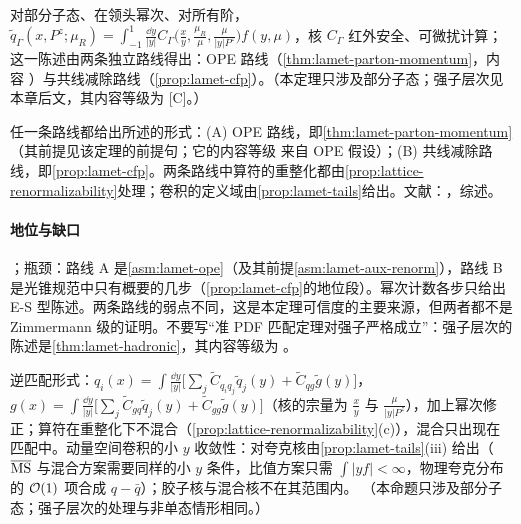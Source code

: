 \begin{theorem}\label{thm:lattice-lamet}
对部分子态、在领头幂次、对所有阶，$\tilde q_\Gamma(x,P^z;\mu_R)=\int_{-1}^1\frac{\dd y}{|y|}C_\Gamma\big(\frac xy,\frac{\mu_R}\mu,\frac\mu{|y|P^z}\big)f(y,\mu)$，核 $C_\Gamma$ 红外安全、可微扰计算；这一陈述由两条独立路线得出：OPE 路线（\cref{thm:lamet-parton-momentum}，内容 \tagA）与共线减除路线（\cref{prop:lamet-cfp}）。（本定理只涉及部分子态；强子层次见本章后文，其内容等级为 [C]。）
\end{theorem}

\begin{proofsketch}
任一条路线都给出所述的形式：(A) OPE 路线，即\cref{thm:lamet-parton-momentum}（其前提见该定理的前提句；它的内容等级 \tagA 来自 OPE 假设）；(B) 共线减除路线，即\cref{prop:lamet-cfp}。两条路线中算符的重整化都由\cref{prop:lattice-renormalizability}处理；卷积的定义域由\cref{prop:lamet-tails}给出。文献：\cite{IzubuchiEtAl2018,Ma:2014jla,MaQiu2018,JiEtAl2021}，综述\cite{Constantinou:2020hdm}。
\end{proofsketch}

\paragraph{地位与缺口}
\tagA；瓶颈：路线 A 是\cref{asm:lamet-ope}（及其前提\cref{asm:lamet-aux-renorm}），路线 B 是光锥规范中只有概要的几步（\cref{prop:lamet-cfp}的地位段）。幂次计数各步只给出 E-S 型陈述。两条路线的弱点不同，这是本定理可信度的主要来源，但两者都不是 Zimmermann 级的证明。不要写“准 PDF 匹配定理对强子严格成立”：强子层次的陈述是\cref{thm:lamet-hadronic}，其内容等级为 \tagC。

\begin{proposition}\label{prop:lamet-gluon-singlet}
逆匹配形式\cite{JiEtAl2021}：$q_i(x)=\int\frac{\dd y}{|y|}\big[\sum_j\tilde C_{q_iq_j}\tilde q_j(y)+\tilde C_{qg}\tilde g(y)\big]$，$g(x)=\int\frac{\dd y}{|y|}\big[\sum_j\tilde C_{gq}\tilde q_j(y)+\tilde C_{gg}\tilde g(y)\big]$（核的宗量为 $\frac xy$ 与 $\frac\mu{|y|P^z}$），加上幂次修正；算符在重整化下不混合（\cref{prop:lattice-renormalizability}(c)），混合只出现在匹配中。动量空间卷积的小 $y$ 收敛性：对夸克核由\cref{prop:lamet-tails}(iii) 给出（$\overline{\mathrm{MS}}$ 与混合方案需要同样的小 $y$ 条件，比值方案只需 $\int|yf|<\infty$，物理夸克分布的 $\mathcal{O}\!\left(1\right)$ 项合成 $q-\bar q$）；胶子核与混合核不在其范围内。
（本命题只涉及部分子态；强子层次的处理与非单态情形相同。）
\end{proposition}

